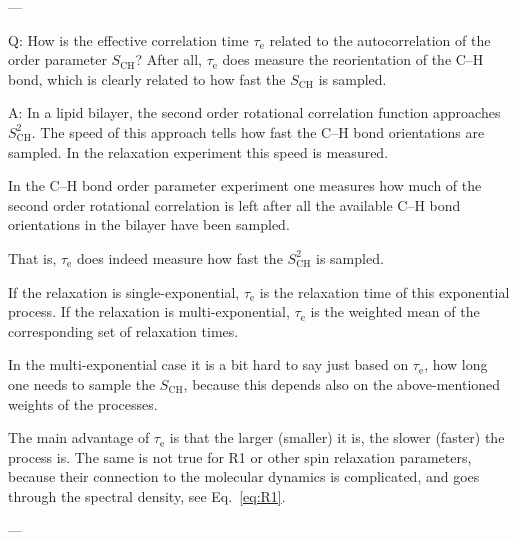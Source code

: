 \documentclass[journal=jpcbfk,manuscript=article,layout=twocolumn]{achemso}
\begin{document}
---

Q: How is the effective correlation time $\tau_\mathrm e$ related to the autocorrelation of the order parameter $S_\mathrm{CH}$?
After all, $\tau_\mathrm e$ does measure the reorientation of the C--H bond, which is clearly related to how fast the $S_\mathrm{CH}$ is sampled.

A: In a lipid bilayer, the second order rotational correlation function approaches $S^2_\mathrm{CH}$. The speed of this approach tells how fast the C--H bond orientations are sampled. In the relaxation experiment this speed is measured.

In the C--H bond order parameter experiment one measures how much of the second order rotational correlation is left after all the available C--H bond orientations in the bilayer have been sampled.

That is,  $\tau_\mathrm e$ does indeed measure how fast the $S^2_\mathrm{CH}$ is sampled.

If the relaxation is single-exponential, $\tau_\mathrm e$ is the relaxation time of this exponential process. If the relaxation is multi-exponential, $\tau_\mathrm e$ is the weighted mean of the corresponding set of relaxation times.

In the multi-exponential case it is a bit hard to say just based on $\tau_\mathrm e$, how long one needs to sample the $S_\mathrm{CH}$, because this depends also on the above-mentioned weights of the processes.

The main advantage of $\tau_\mathrm e$ is that the larger (smaller) it is, the slower (faster) the process is. The same is not true for R1 or other spin relaxation parameters, because their connection to the molecular dynamics is complicated, and goes through the spectral density, see Eq.~\eqref{eq:R1}.

---


\end{document}
